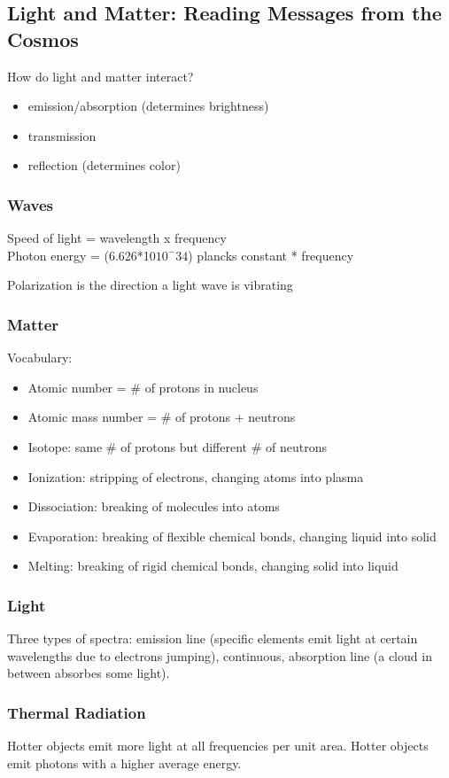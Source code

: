 \documentclass[12pt]{article}
\begin{document}
\subsection{Light and Matter: Reading Messages from the Cosmos}
How do light and matter interact?
\begin{itemize}
\item emission/absorption (determines brightness)
\item transmission
\item reflection (determines color)
\end{itemize}

\subsubsection{Waves}
Speed of light = wavelength x frequency\\
Photon energy = (6.626*10$10^-34$) plancks constant * frequency

Polarization is the direction a light wave is vibrating

\subsubsection{Matter}
Vocabulary:
\begin{itemize}
\item Atomic number = \# of protons in nucleus
\item Atomic mass number = \# of protons + neutrons
\item Isotope: same \# of protons but different \# of neutrons
\item Ionization: stripping of electrons, changing atoms into plasma
\item Dissociation: breaking of molecules into atoms
\item Evaporation: breaking of flexible chemical bonds, changing liquid into solid
\item Melting: breaking of rigid chemical bonds, changing solid into liquid
\end{itemize}

\subsubsection{Light}
Three types of spectra: emission line (specific elements emit light at certain wavelengths due to electrons jumping), continuous, absorption line (a cloud in between absorbes some light).

\subsubsection{Thermal Radiation}
Hotter objects emit more light at all frequencies per unit area. Hotter objects emit photons with a higher average energy.
\end{document}
